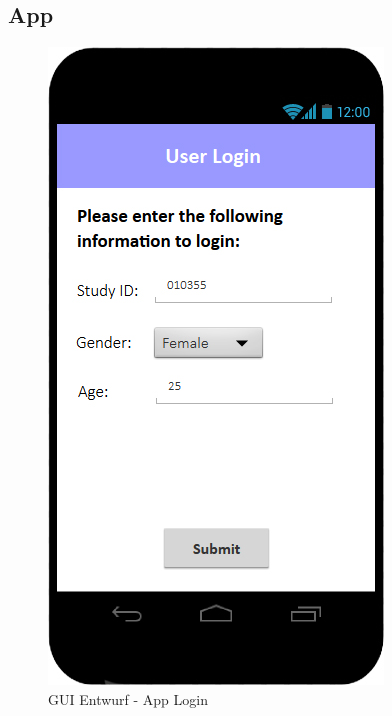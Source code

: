 \documentclass[a4paper]{scrreprt}
\begin{document}
        \newpage
        \subsection{App}
	        \vspace*{2cm}
	        \begin{figure}[ht]
                \centering
                \includegraphics[scale = 0.3]{android_login.jpg}
                \caption{GUI Entwurf - App Login}
            \end{figure}
	
\end{document}
